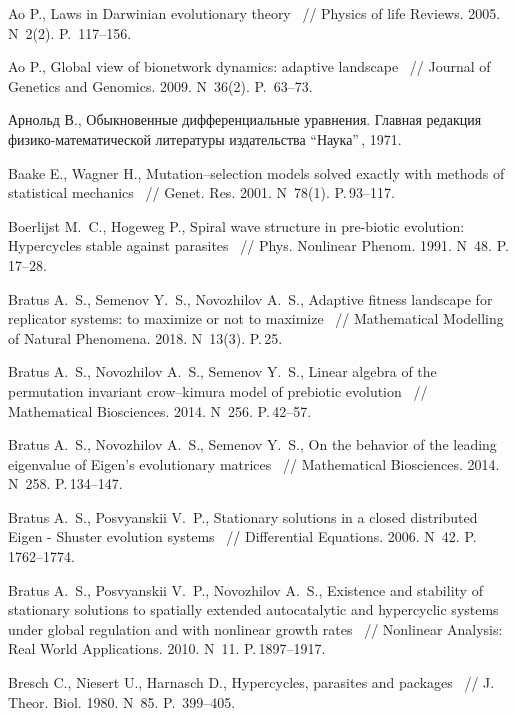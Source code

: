 \begin{thebibliography}{99}\itemsep=-2pt

 Ao P.\:, Laws in Darwinian evolutionary theory ~// Physics of life Reviews. 2005. N~2(2). P.\, 117--156.

 Ao P.\:, Global view of bionetwork dynamics: adaptive landscape ~// Journal of Genetics and Genomics. 2009. N~36(2). P.\, 63--73.

 Арнольд В.\:, Обыкновенные дифференциальные уравнения. Главная редакция физико-математической литературы издательства ``Наука''\,, 1971.

 Baake E., Wagner H.\:,  Mutation–selection models solved exactly with methods of statistical mechanics ~// Genet. Res. 2001. N~78(1). P.\,93--117.

 Boerlijst M.~C., Hogeweg P.\:, Spiral wave structure in pre-biotic evolution: Hypercycles stable against parasites ~// Phys. Nonlinear Phenom. 1991. N~48. P.\, 17--28.

 Bratus A.~S., Semenov Y.~S., Novozhilov A.~S.\:, Adaptive fitness landscape for replicator systems: to maximize or not to maximize ~// Mathematical Modelling of Natural Phenomena. 2018. N~13(3). P.\,25.

 Bratus A.~S., Novozhilov A.~S., Semenov Y.~S.\:, Linear algebra of the permutation invariant crow–kimura model of prebiotic evolution ~// Mathematical Biosciences. 2014. N~256. P.\,42--57.

 Bratus A.~S., Novozhilov A.~S., Semenov Y.~S.\:, On the behavior of the leading eigenvalue of Eigen’s evolutionary matrices ~// Mathematical Biosciences. 2014. N~258. P.\,134--147.

 Bratus A.~S., Posvyanskii V.~P.\:, Stationary solutions in a closed distributed Eigen - Shuster evolution systems ~// Differential Equations. 2006. N~42. P.\,1762--1774.

 Bratus A.~S., Posvyanskii V.~P., Novozhilov A.~S.\:, Existence and stability of stationary solutions to spatially extended autocatalytic and hypercyclic systems under global regulation and with nonlinear growth rates ~// Nonlinear Analysis: Real World Applications. 2010. N~11. P.\,1897--1917.

 Bresch C., Niesert U., Harnasch D.\:, Hypercycles, parasites and packages ~// J. Theor. Biol. 1980. N~85. P.\, 399--405.


\end{thebibliography}
